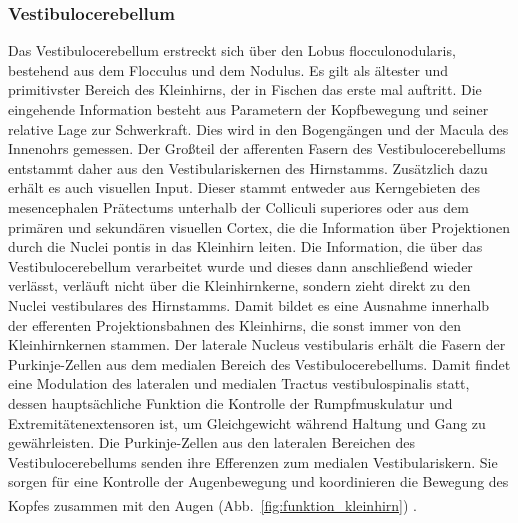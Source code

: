 \documentclass[12pt,a4paper,pdftex]{article}
\begin{document}
\subsubsection*{Vestibulocerebellum} 
Das Vestibulocerebellum erstreckt sich über den Lobus flocculonodularis, bestehend aus dem Flocculus und dem Nodulus. Es gilt als ältester und primitivster Bereich des Kleinhirns, der in Fischen das erste mal auftritt. Die eingehende Information besteht aus Parametern der Kopfbewegung und seiner relative Lage zur Schwerkraft. Dies wird in den Bogengängen und der Macula des Innenohrs gemessen. Der Großteil der afferenten Fasern des Vestibulocerebellums entstammt daher aus den Vestibulariskernen des Hirnstamms. Zusätzlich dazu erhält es auch visuellen Input. Dieser stammt entweder aus Kerngebieten des mesencephalen Prätectums unterhalb der Colliculi superiores oder aus dem primären und sekundären visuellen Cortex, die die Information über Projektionen durch die Nuclei pontis in das Kleinhirn leiten. Die Information, die über das Vestibulocerebellum verarbeitet wurde und dieses dann anschließend wieder verlässt, verläuft nicht über die Kleinhirnkerne, sondern zieht direkt zu den Nuclei vestibulares des Hirnstamms. Damit bildet es eine Ausnahme innerhalb der efferenten Projektionsbahnen des Kleinhirns, die sonst immer von den Kleinhirnkernen stammen. Der laterale Nucleus vestibularis erhält die Fasern der Purkinje-Zellen aus dem medialen Bereich des Vestibulocerebellums. Damit findet eine Modulation des lateralen und medialen Tractus vestibulospinalis statt, dessen hauptsächliche Funktion die Kontrolle der Rumpfmuskulatur und Extremitätenextensoren ist, um Gleichgewicht während Haltung und Gang zu gewährleisten.  Die Purkinje-Zellen aus den lateralen Bereichen des Vestibulocerebellums senden ihre Efferenzen zum medialen Vestibulariskern. Sie sorgen für eine Kontrolle der Augenbewegung und koordinieren die Bewegung des Kopfes zusammen mit den Augen (Abb.~\ref{fig:funktion_kleinhirn}) \textsuperscript{\cite[42]{kandel2013principles}}.       
\end{document}
